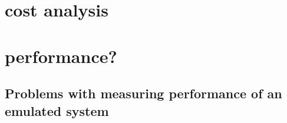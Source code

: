 




\section{cost analysis}
\section{performance?}
\subsection{Problems with measuring performance of an emulated system}



